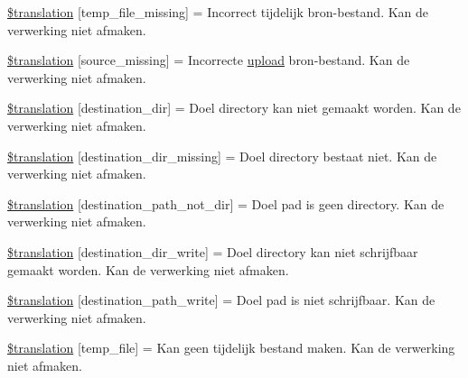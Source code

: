 \begin{DoxyCompactItemize}
\hyperlink{class_8upload_8nl___n_l_8php_ab0fa87a88aba2624004581eed0633325}{\$translation} \mbox{[}\textquotesingle{}temp\+\_\+file\+\_\+missing\textquotesingle{}\mbox{]} = \textquotesingle{}Incorrect tijdelijk bron-\/bestand. Kan de verwerking niet afmaken.\textquotesingle{}
\item 
\hyperlink{class_8upload_8nl___n_l_8php_aceaaf7355acaaf10f0ae60378d03c468}{\$translation} \mbox{[}\textquotesingle{}source\+\_\+missing\textquotesingle{}\mbox{]} = \textquotesingle{}Incorrecte \hyperlink{classupload}{upload} bron-\/bestand. Kan de verwerking niet afmaken.\textquotesingle{}
\item 
\hyperlink{class_8upload_8nl___n_l_8php_aff2427c72a2598aefa6d58df1dd18b08}{\$translation} \mbox{[}\textquotesingle{}destination\+\_\+dir\textquotesingle{}\mbox{]} = \textquotesingle{}Doel directory kan niet gemaakt worden. Kan de verwerking niet afmaken.\textquotesingle{}
\item 
\hyperlink{class_8upload_8nl___n_l_8php_a9ef28d3cf09942c6c0a1e77fa09185e8}{\$translation} \mbox{[}\textquotesingle{}destination\+\_\+dir\+\_\+missing\textquotesingle{}\mbox{]} = \textquotesingle{}Doel directory bestaat niet. Kan de verwerking niet afmaken.\textquotesingle{}
\item 
\hyperlink{class_8upload_8nl___n_l_8php_a5704a67137126e8c87b7a364175929d4}{\$translation} \mbox{[}\textquotesingle{}destination\+\_\+path\+\_\+not\+\_\+dir\textquotesingle{}\mbox{]} = \textquotesingle{}Doel pad is geen directory. Kan de verwerking niet afmaken.\textquotesingle{}
\item 
\hyperlink{class_8upload_8nl___n_l_8php_a97608ea194a616db49141a0e6dee900c}{\$translation} \mbox{[}\textquotesingle{}destination\+\_\+dir\+\_\+write\textquotesingle{}\mbox{]} = \textquotesingle{}Doel directory kan niet schrijfbaar gemaakt worden. Kan de verwerking niet afmaken.\textquotesingle{}
\item 
\hyperlink{class_8upload_8nl___n_l_8php_a40e4e1962226b89fd76da5819a9602b0}{\$translation} \mbox{[}\textquotesingle{}destination\+\_\+path\+\_\+write\textquotesingle{}\mbox{]} = \textquotesingle{}Doel pad is niet schrijfbaar. Kan de verwerking niet afmaken.\textquotesingle{}
\item 
\hyperlink{class_8upload_8nl___n_l_8php_a2baece8da11e20d45175db91851ec3e3}{\$translation} \mbox{[}\textquotesingle{}temp\+\_\+file\textquotesingle{}\mbox{]} = \textquotesingle{}Kan geen tijdelijk bestand maken. Kan de verwerking niet afmaken.\textquotesingle{}
\item 

\end{DoxyCompactItemize}
